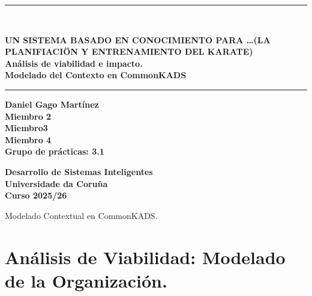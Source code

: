 \documentclass[12pt,a4paper,twoside,spanish]{article}      %
\begin{document}
    \def\chaptername{Capítulo}
    \def\tablename{Tabla}
    \def\listtablename{Índice de Tablas}
    \chapterfont{\LARGE\raggedleft}
    

    \pagestyle{empty}
    
    \begin{titlepage}
        \setlength{\parindent}{0cm} \setlength{\parskip}{0cm}
        \newcommand{\HRule}{\rule{\linewidth}{1mm}}
        
        \vspace*{2cm}
        \HRule \\[0.5cm]
        \begin{center}
        \textsf{\textbf{\large UN SISTEMA BASADO EN CONOCIMIENTO PARA \ldots(LA PLANIFIACIÖN Y ENTRENAMIENTO DEL KARATE)\\[1.5cm]
        Análisis de viabilidad e impacto. \\[0.25cm] Modelado del Contexto en CommonKADS \\[0.5cm]}}
        \HRule \vspace*{4cm}
        
        \textsf{\textbf{\normalsize Daniel Gago Martínez\\Miembro 2\\Miembro3\\Miembro 4 \\[1cm]
        Grupo de prácticas: 3.1\\[3.5cm]}}
        
        \textsf{\textbf{\small Desarrollo de Sistemas Inteligentes\\
        Universidade da Coruña \\ Curso 2025/26}}
        \end{center}
    \end{titlepage}
    
    \cleardoublepage
    \tableofcontents
    \cleardoublepage
    
    \pagestyle{myheadings}  {Modelado Contextual en CommonKADS.}
    
    \setlength{\parindent}{1,5cm} \setlength{\parskip}{0,7cm}
    
    \cleardoublepage
    
    \section{Análisis de Viabilidad: Modelado de la Organización.}
\end{document}
